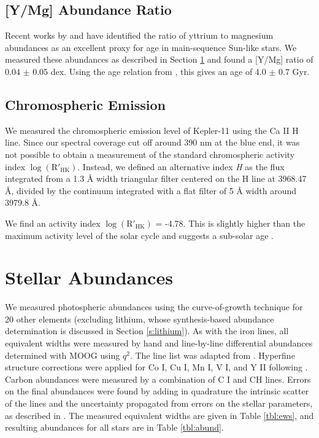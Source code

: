 \documentclass[oneside]{emulateapj}
\begin{document}
\subsection{[Y/Mg] Abundance Ratio}

Recent works by \citet{Nissen2015} and \citet{TucciMaia2016} have identified the ratio of yttrium to magnesium abundances as an excellent proxy for age in main-sequence Sun-like stars. We measured these abundances as described in Section \ref{s:abundances} and found a [Y/Mg] ratio of 0.04 $\pm$ 0.05 dex. Using the age relation from \citet{TucciMaia2016}, this gives an age of 4.0 $\pm$ 0.7 Gyr. 

\subsection{Chromospheric Emission}

We measured the chromospheric emission level of Kepler-11 using the Ca II H line. Since our spectral coverage cut off around 390 nm at the blue end, it was not possible to obtain a measurement of the standard chromospheric activity index $\log(\mathrm{R'_{HK}})$. Instead, we defined an alternative index \textit{H} as the flux integrated from a 1.3 \r{A} width triangular filter centered on the H line at 3968.47 \r{A}, divided by the continuum integrated with a flat filter of 5 \r{A} width around 3979.8 \r{A}.  

We find an activity index $\log(\mathrm{R'_{HK}})$ = -4.78. This is slightly higher than the maximum activity level of the solar cycle and suggests a sub-solar age \citep{Hall2009, Ramirez2014}.


\section{Stellar Abundances}
\label{s:abundances}

We measured photospheric abundances using the curve-of-growth technique for 20 other elements (excluding lithium, whose synthesis-based abundance determination is discussed in Section \ref{s:lithium}). As with the iron lines, all equivalent widths were measured by hand and line-by-line differential abundances determined with MOOG using $q^2$. The line list was adapted from . Hyperfine structure corrections were applied for Co I, Cu I, Mn I, V I, and Y II following . Carbon abundances were measured by a combination of C I and CH lines. Errors on the final abundances were found by adding in quadrature the intrinsic scatter of the lines and the uncertainty propagated from errors on the stellar parameters, as described in . The measured equivalent widths are given in Table \ref{tbl:ews}, and resulting abundances for all stars are in Table \ref{tbl:abund}.
\end{document}
